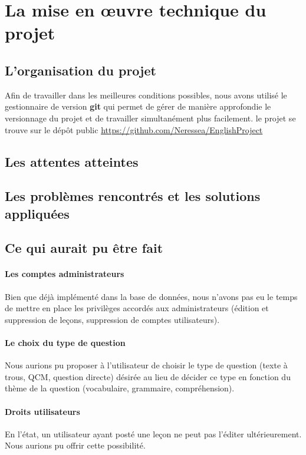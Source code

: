 \section{La mise en œuvre technique du projet}

\subsection{L'organisation du projet}

Afin de travailler dans les meilleures conditions possibles, nous avons utilisé le gestionnaire de version \textbf{git} qui permet de gérer de manière approfondie le versionnage du projet et de travailler simultanément plus facilement. le projet se trouve sur le dépôt public \url{https://github.com/Neressea/EnglishProject}

\subsection{Les attentes atteintes}


\subsection{Les problèmes rencontrés et les solutions appliquées}

	
\subsection{Ce qui aurait pu être fait}
\paragraph{Les comptes administrateurs}
Bien que déjà implémenté dans la base de données, nous n'avons pas eu le temps de mettre en place les privilèges accordés aux administrateurs (édition et suppression de leçons, suppression de comptes utilisateurs).

\paragraph{Le choix du type de question}
Nous aurions pu proposer à l'utilisateur de choisir le type de question (texte à trous, QCM, question directe) désirée au lieu de décider ce type en fonction du thème de la question (vocabulaire, grammaire, compréhension).

\paragraph{Droits utilisateurs}
En l'état, un utilisateur ayant posté une leçon ne peut pas l'éditer ultérieurement. Nous aurions pu offrir cette possibilité.